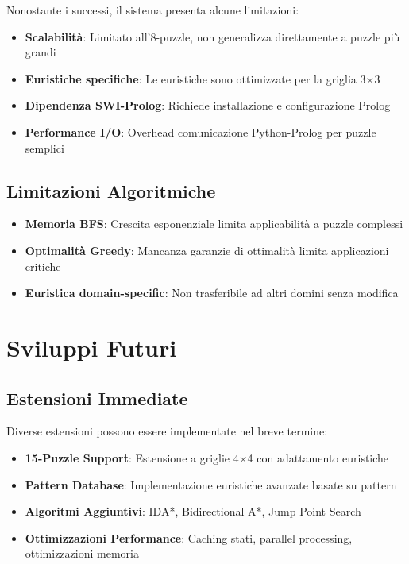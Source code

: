 \documentclass[12pt,a4paper]{report}
\theoremstyle{definition}
\begin{document}
Nonostante i successi, il sistema presenta alcune limitazioni:

\begin{itemize}
    \item \textbf{Scalabilità}: Limitato all'8-puzzle, non generalizza direttamente a puzzle più grandi
    \item \textbf{Euristiche specifiche}: Le euristiche sono ottimizzate per la griglia 3×3
    \item \textbf{Dipendenza SWI-Prolog}: Richiede installazione e configurazione Prolog
    \item \textbf{Performance I/O}: Overhead comunicazione Python-Prolog per puzzle semplici
\end{itemize}

\subsection{Limitazioni Algoritmiche}

\begin{itemize}
    \item \textbf{Memoria BFS}: Crescita esponenziale limita applicabilità a puzzle complessi
    \item \textbf{Optimalità Greedy}: Mancanza garanzie di ottimalità limita applicazioni critiche
    \item \textbf{Euristica domain-specific}: Non trasferibile ad altri domini senza modifica
\end{itemize}

\section{Sviluppi Futuri}

\subsection{Estensioni Immediate}

Diverse estensioni possono essere implementate nel breve termine:

\begin{itemize}
    \item \textbf{15-Puzzle Support}: Estensione a griglie 4×4 con adattamento euristiche
    \item \textbf{Pattern Database}: Implementazione euristiche avanzate basate su pattern
    \item \textbf{Algoritmi Aggiuntivi}: IDA*, Bidirectional A*, Jump Point Search
    \item \textbf{Ottimizzazioni Performance}: Caching stati, parallel processing, ottimizzazioni memoria
\end{itemize}
\end{document}
